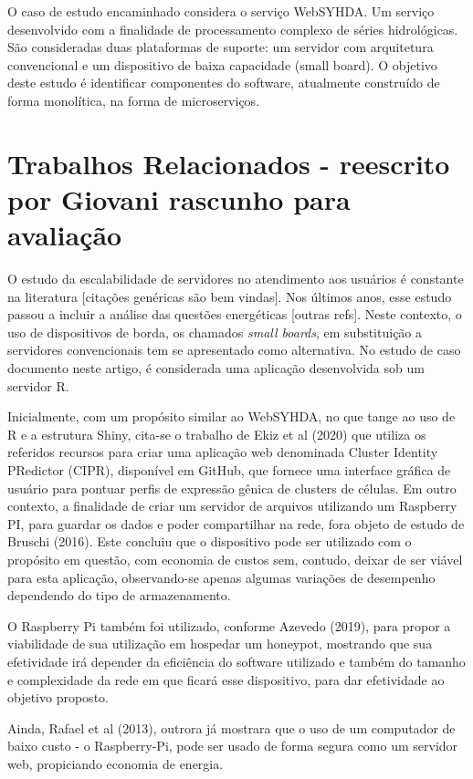 \documentclass[12pt,english,brazil]{article}
\begin{document}
O caso de estudo encaminhado considera o serviço WebSYHDA. Um serviço desenvolvido com a finalidade de processamento complexo de séries hidrológicas. São consideradas duas plataformas de suporte: um servidor com arquitetura convencional e um dispositivo de baixa capacidade (small board). O objetivo deste estudo é identificar componentes do software, atualmente construído de forma monolítica, na forma de microserviços.

\section{Trabalhos Relacionados  - reescrito por Giovani rascunho para avaliação} \label{sec:TrabalhosRelacionados}

O estudo da escalabilidade de servidores no atendimento aos usuários é constante na literatura [citações
genéricas são bem vindas]. Nos últimos anos, esse estudo passou a incluir a análise das questões
energéticas [outras refs]. Neste contexto, o uso de dispositivos de borda, os chamados \emph{small
boards}, em substituição a servidores convencionais tem se apresentado como alternativa. No estudo de caso documento neste artigo, é considerada uma aplicação desenvolvida sob um servidor R.

Inicialmente, com um propósito similar ao WebSYHDA, no que tange ao uso de R e a estrutura Shiny, cita-se o  trabalho de Ekiz et al (2020) que utiliza os referidos recursos para criar uma aplicação web denominada Cluster Identity PRedictor (CIPR), disponível em GitHub, que fornece uma interface gráfica de usuário para pontuar perfis de expressão gênica de clusters de células.
Em outro contexto, a finalidade de criar um servidor de arquivos utilizando um Raspberry PI, para guardar os dados e poder compartilhar na rede, fora objeto de estudo de Bruschi (2016). Este concluiu que o dispositivo pode ser utilizado com o propósito em questão, com economia de custos sem, contudo, deixar de ser viável para esta aplicação, observando-se apenas algumas variações de desempenho dependendo do tipo de armazenamento.

O Raspberry Pi também foi utilizado, conforme Azevedo (2019), para propor a viabilidade de sua utilização em hospedar um honeypot, mostrando que sua efetividade irá depender da eficiência do software utilizado e também do tamanho e complexidade da rede em que ficará esse dispositivo, para dar efetividade ao objetivo proposto. 

Ainda, Rafael et al (2013), outrora já mostrara que o uso de um computador de baixo custo - o Raspberry-Pi, pode ser usado de forma segura como um servidor web,  propiciando economia de energia.
\end{document}
